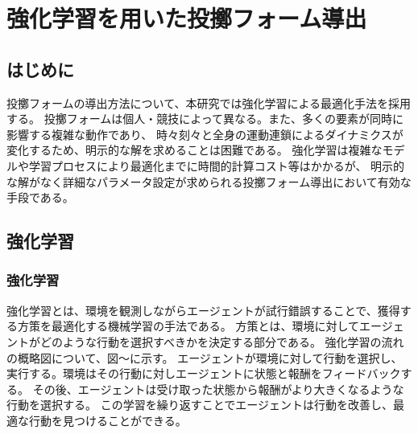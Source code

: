 \chapter[強化学習を用いた投擲フォーム導出]{強化学習を用いた投擲フォーム導出}

\section{はじめに}
投擲フォームの導出方法について、本研究では強化学習による最適化手法を採用する。
投擲フォームは個人・競技によって異なる。また、多くの要素が同時に影響する複雑な動作であり、
時々刻々と全身の運動連鎖によるダイナミクスが変化するため、明示的な解を求めることは困難である。
強化学習は複雑なモデルや学習プロセスにより最適化までに時間的計算コスト等はかかるが、
明示的な解がなく詳細なパラメータ設定が求められる投擲フォーム導出において有効な手段である。
\section{強化学習}
\subsection{強化学習}
強化学習とは、環境を観測しながらエージェントが試行錯誤することで、獲得する方策を最適化する機械学習の手法である。
方策とは、環境に対してエージェントがどのような行動を選択すべきかを決定する部分である。
強化学習の流れの概略図について、図～に示す。
エージェントが環境に対して行動を選択し、実行する。環境はその行動に対しエージェントに状態と報酬をフィードバックする。
その後、エージェントは受け取った状態から報酬がより大きくなるような行動を選択する。
この学習を繰り返すことでエージェントは行動を改善し、最適な行動を見つけることができる。
